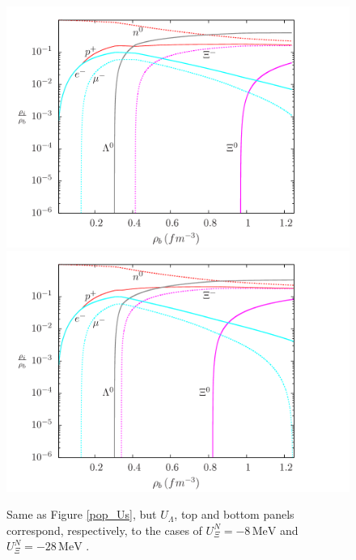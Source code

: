\documentclass[twocolumn,showpacs,aps]{revtex4}
\begin{document}
\begin{figure}
\centering
\includegraphics[width=9.cm]{pop_swrdp_l0040_L97a32_Uc8.png}
    \centering
 \includegraphics[width=9.cm]{pop_swrdp_l0040_L97a32_Uc28.png}
      \caption{Same as Figure \ref{pop_Us}, but $U_{\Lambda}$, top and bottom panels correspond, respectively, to the cases of $U_{\Xi}^N=-8\, \mathrm{MeV}$
  and $U_{\Xi}^N=-28\, \mathrm{MeV}$
 .
}\label{pop_Uc}
 \end{figure}
\end{document}
